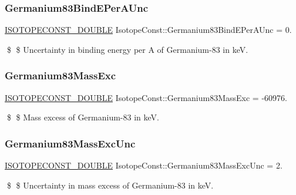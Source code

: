 \subsubsection{\texorpdfstring{Germanium83\+Bind\+E\+Per\+A\+Unc}{Germanium83BindEPerAUnc}}
{\footnotesize\ttfamily \mbox{\hyperlink{group___isotope_const-_macros_ga8f45a7272ce02c0b4c65c44636ed719a}{I\+S\+O\+T\+O\+P\+E\+C\+O\+N\+S\+T\+\_\+\+D\+O\+U\+B\+LE}} Isotope\+Const\+::\+Germanium83\+Bind\+E\+Per\+A\+Unc = 0.}

\$ \$ Uncertainty in binding energy per A of Germanium-\/83 in keV. \mbox{\label{group___isotope_const-_germanium-_ge83_gabb4aabd3c51891ddd80b64aa7b43f6e7}} 
\subsubsection{\texorpdfstring{Germanium83\+Mass\+Exc}{Germanium83MassExc}}
{\footnotesize\ttfamily \mbox{\hyperlink{group___isotope_const-_macros_ga8f45a7272ce02c0b4c65c44636ed719a}{I\+S\+O\+T\+O\+P\+E\+C\+O\+N\+S\+T\+\_\+\+D\+O\+U\+B\+LE}} Isotope\+Const\+::\+Germanium83\+Mass\+Exc = -\/60976.}

\$ \$ Mass excess of Germanium-\/83 in keV. \mbox{\label{group___isotope_const-_germanium-_ge83_ga3115e5ef9f033fcda4b227c0523c2e17}} 
\subsubsection{\texorpdfstring{Germanium83\+Mass\+Exc\+Unc}{Germanium83MassExcUnc}}
{\footnotesize\ttfamily \mbox{\hyperlink{group___isotope_const-_macros_ga8f45a7272ce02c0b4c65c44636ed719a}{I\+S\+O\+T\+O\+P\+E\+C\+O\+N\+S\+T\+\_\+\+D\+O\+U\+B\+LE}} Isotope\+Const\+::\+Germanium83\+Mass\+Exc\+Unc = 2.}

\$ \$ Uncertainty in mass excess of Germanium-\/83 in keV. \mbox{\label{group___isotope_const-_germanium-_ge83_gaad6af1c2f9f5f698f12cdecfdbf089e2}} 
